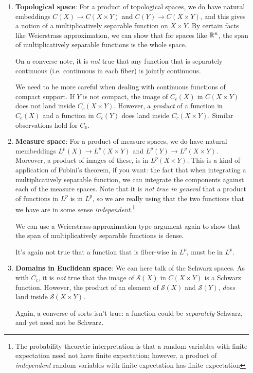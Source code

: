 \documentclass[a4paper]{amsart}
\newcommand{\schwarz}[1]{\mathcal{S}\left(#1\right)}
\begin{document}
\begin{enumerate}

\item {\bf Topological space}: For a product of topological spaces, we
  do have natural embeddings $C(X) \to C(X\times Y)$ and $C(Y) \to
  C(X \times Y)$, and this gives a notion of a multiplicatively
  separable function on $X \times Y$. By certain facts like
  Weierstrass approximation, we can show that for spaces like
  $\mathbb{R}^n$, the span of multiplicatively separable functions is the whole
  space.

  On a converse note, it is {\em not} true that any function that is
  separately continuous (i.e. continuous in each fiber) is jointly
  continuous.

  We need to be more careful when dealing with continuous functions of
  compact support. If $Y$ is not compact, the image of $C_c(X)$ in
  $C(X \times Y)$ does not land inside $C_c(X \times Y)$. However, a
  {\em product} of a function in $C_c(X)$ and a function in $C_c(Y)$
  does land inside $C_c(X \times Y)$. Similar observations hold for
  $C_0$.

\item {\bf Measure space}: For a product of measure spaces, we do have
  natural membeddings $L^p(X) \to L^p(X \times Y)$ and $L^p(Y) \to
  L^p(X \times Y)$. Moreover, a product of images of these, is in
  $L^p(X \times Y)$. This is a kind of application of Fubini's
  theorem, if you want: the fact that when integrating a
  multiplicatively separable function, we can integrate the components
  against each of the measure spaces. Note that it is {\em not true in
    general} that a product of functions in $L^p$ is in $L^p$, so we
  are really using that the two functions that we have are in some
  sense {\em independent}.\footnote{The probability-theoretic
    interpretation is that a random variables with finite expectation
    need not have finite expectation; however, a product of {\em
      independent} random variables with finite expectation has finite
    expectation}

  We can use a Weierstrass-approximation type argument again to show
  that the span of multiplicatively separable functions is dense.

  It's again not true that a function that is fiber-wise in $L^p$,
  must be in $L^p$.

\item {\bf Domains in Euclidean space}: We can here talk of the
  Schwarz spaces. As with $C_c$, it is {\em not} true that the image
  of $\schwarz{X}$ in $C(X \times Y)$ is a Schwarz function. However,
  the product of an element of $\schwarz{X}$ and $\schwarz{Y}$, {\em
    does} land inside $\schwarz{X \times Y}$.

  Again, a converse of sorts isn't true: a function could be {\em
    separately} Schwarz, and yet need not be Schwarz.

\end{enumerate}
\end{document}
